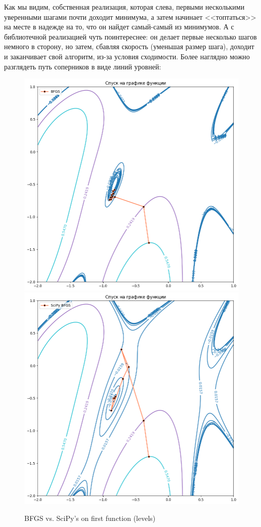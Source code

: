 \documentclass[12pt, a4paper, oneside, final]{article}
\begin{document}
	Как мы видим, собственная реализация, которая слева, первыми несколькими уверенными шагами почти доходит минимума, а затем начинает <<топтаться>> на месте в надежде на то, что он найдет самый-самый из минимумов.
	А с библиотечной реализацией чуть поинтереснее: он делает первые несколько шагов немного в сторону, но затем, сбавляя скорость (уменьшая размер шага), доходит и заканчивает свой алгоритм, из-за условия сходимости.
	Более наглядно можно разглядеть путь соперников в виде линий уровней:
	\begin{figure}[H]
		\centering
		\includegraphics[scale = 0.35]{Image/T2A_F1_BFGS_LEVELS.png}
		\includegraphics[scale = 0.35]{Image/T2A_F1_scipy_BFGS_LEVELS.png}
		\caption*{BFGS vs. SciPy's on first function (levels)}
	\end{figure}
\end{document}

